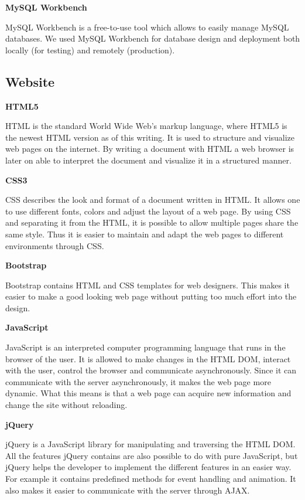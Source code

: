 \textbf{MySQL Workbench}

MySQL Workbench is a free-to-use tool which allows to easily manage MySQL databases.
We used MySQL Workbench for database design and deployment both locally (for testing) and remotely (production).


\subsection{Website}

\textbf{HTML5} \nocite{HTML5}

HTML is the standard World Wide Web's markup language, where HTML5 is the newest HTML version as of this writing.
It is used to structure and visualize web pages on the internet.
By writing a document with HTML a web browser is later on able to interpret the document and visualize it in a structured manner.

\textbf{CSS3} \nocite{CSS3}

CSS describes the look and format of a document written in HTML.
It allows one to use different fonts, colors and adjust the layout of a web page.
By using CSS and separating it from the HTML, it is possible to allow multiple pages share the same style.
Thus it is easier to maintain and adapt the web pages to different environments through CSS.

\textbf{Bootstrap} \nocite{Bootstrap}

Bootstrap contains HTML and CSS templates for web designers.
This makes it easier to make a good looking web page without putting too much effort into the design.

\textbf{JavaScript} \nocite{JavaScript}

JavaScript is an interpreted computer programming language that runs in the browser of the user.
It is allowed to make changes in the HTML DOM, interact with the user, control the browser and communicate asynchronously.
Since it can communicate with the server asynchronously, it makes the web page more dynamic.
What this means is that a web page can acquire new information and change the site without reloading.

\textbf{jQuery} \nocite{jQuery}

jQuery is a JavaScript library for manipulating and traversing the HTML DOM.
All the features jQuery contains are also possible to do with pure JavaScript, but jQuery helps the developer to implement the different features in an easier way.
For example it contains predefined methods for event handling and animation.
It also makes it easier to communicate with the server through AJAX.

